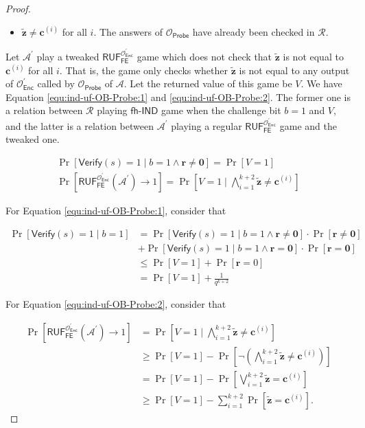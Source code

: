 \begin{proof}
\begin{itemize}
	\item $\mathbf{\tilde{z}} \neq \mathbf{c}^{(i)}$ for all $i$. The answers of $\mathcal{O}_\textsf{Probe}$ have already been checked in $\mathcal{R}$. 
\end{itemize}

Let $\mathcal{A}^\prime$ play a tweaked $\textsf{RUF}_\textsf{FE}^{\mathcal{O}^\prime_{\textsf{Enc}}}$ game which does not check that $\mathbf{\tilde{z}}$ is not equal to $\mathbf{c}^{(i)}$ for all $i$. That is, the game only checks whether $\mathbf{\tilde{z}}$ is not equal to any output of $\mathcal{O}^\prime_\textsf{Enc}$ called by $\mathcal{O}_\textsf{Probe}$ of $\mathcal{A}$. Let the returned value of this game be $V$. We have Equation \ref{equ:ind-uf-OB-Probe:1} and \ref{equ:ind-uf-OB-Probe:2}. The former one is a relation between $\mathcal{R}$ playing $\textsf{fh-IND}$ game when the challenge bit $b=1$ and $V$, and the latter is a relation between $\mathcal{A}^\prime$ playing a regular $\textsf{RUF}_\textsf{FE}^{\mathcal{O}^\prime_{\textsf{Enc}}}$ game and the tweaked one.

\begin{gather}
	\Pr[\textsf{Verify}(s) = 1 \mid b = 1 \wedge \mathbf{r} \neq \mathbf{0}] = \Pr[V = 1] \label{equ:ind-uf-OB-Probe:1} \\
	\Pr[\textsf{RUF}_\textsf{FE}^{\mathcal{O}^\prime_{\textsf{Enc}}}(\mathcal{A}^\prime) \to 1] = \Pr\left[ V = 1 \mid \bigwedge_{i=1}^{k+2} \mathbf{\tilde{z}} \neq \mathbf{c}^{(i)} \right] \label{equ:ind-uf-OB-Probe:2}
\end{gather}

\noindent For Equation \ref{equ:ind-uf-OB-Probe:1}, consider that

\begin{align*}
	\Pr[\textsf{Verify}(s) = 1 \mid b = 1]
	&= \Pr[\textsf{Verify}(s) = 1 \mid b = 1 \wedge \mathbf{r} \neq \mathbf{0}] \cdot \Pr[\mathbf{r} \neq \mathbf{0}] \\
	&+ \Pr[\textsf{Verify}(s) = 1 \mid b = 1 \wedge \mathbf{r} = \mathbf{0}] \cdot \Pr[\mathbf{r} = \mathbf{0}] \\
	&\leq \Pr[V = 1] + \Pr[\mathbf{r} = 0] \\
	&= \Pr[V = 1] + \frac{1}{q^{k+2}} 
\end{align*}

\noindent For Equation \ref{equ:ind-uf-OB-Probe:2}, consider that

\begin{align*}
	\Pr[\textsf{RUF}_\textsf{FE}^{\mathcal{O}^\prime_{\textsf{Enc}}}(\mathcal{A}^\prime) \to 1] 
	&= \Pr\left[ V = 1 \mid \bigwedge_{i=1}^{k+2} \mathbf{\tilde{z}} \neq \mathbf{c}^{(i)} \right] \\ 
	& \geq \Pr[V = 1] - \Pr \left[ \neg  \left( \bigwedge_{i=1}^{k+2} \mathbf{\tilde{z}} \neq \mathbf{c}^{(i)} \right) \right] \\
	& = \Pr[V = 1] - \Pr \left[ \bigvee_{i=1}^{k+2} \mathbf{\tilde{z}} = \mathbf{c}^{(i)} \right] \\
	& \geq \Pr[V = 1] - \sum_{i=1}^{k+2} \Pr[\mathbf{\tilde{z}} = \mathbf{c}^{(i)}].
\end{align*}


\end{proof}
